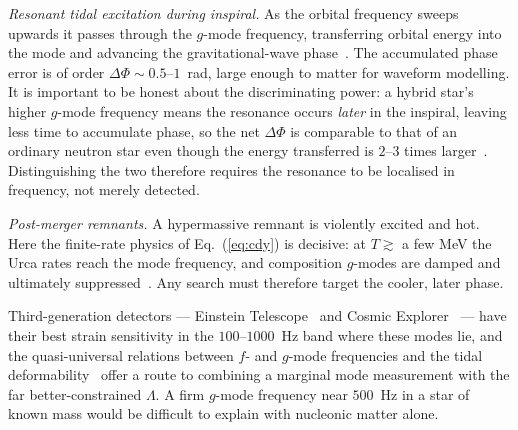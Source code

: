 \documentclass[aps,prd,twocolumn,superscriptaddress,nofootinbib,10pt]{revtex4-2}
\begin{document}
\emph{Resonant tidal excitation during inspiral.} As the orbital frequency
sweeps upwards it passes through the $g$-mode frequency, transferring orbital
energy into the mode and advancing the gravitational-wave phase~\cite{Lai1994}.
The accumulated phase error is of order $\Delta\Phi\sim0.5$--$1$~rad, large
enough to matter for waveform modelling. It is important to be honest about the
discriminating power: a hybrid star's higher $g$-mode frequency means the
resonance occurs \emph{later} in the inspiral, leaving less time to accumulate
phase, so the net $\Delta\Phi$ is comparable to that of an ordinary neutron star
even though the energy transferred is $2$--$3$ times
larger~\cite{Jaikumar2021}. Distinguishing the two therefore requires the
resonance to be localised in frequency, not merely detected.

\emph{Post-merger remnants.} A hypermassive remnant is violently excited and
hot. Here the finite-rate physics of Eq.~(\ref{eq:cdy}) is decisive: at
$T\gtrsim$ a few MeV the Urca rates reach the mode frequency, and composition
$g$-modes are damped and ultimately suppressed~\cite{Counsell2025}. Any search
must therefore target the cooler, later phase.

Third-generation detectors --- Einstein Telescope~\cite{Punturo2010} and Cosmic
Explorer~\cite{Reitze2019} --- have their best strain sensitivity in the
$100$--$1000$~Hz band where these modes lie, and the quasi-universal relations
between $f$- and $g$-mode frequencies and the tidal
deformability~\cite{ZhaoLattimer2022} offer a route to combining a marginal mode
measurement with the far better-constrained $\Lambda$. A firm $g$-mode frequency
near $500$~Hz in a star of known mass would be difficult to explain with
nucleonic matter alone.

\begin{acknowledgments}
\end{acknowledgments}



\end{document}
